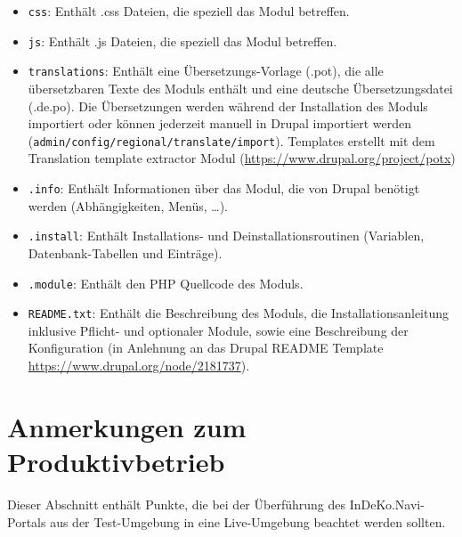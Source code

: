 \begin{itemize}
	\item \lstinline|css|: Enthält .css Dateien, die speziell das Modul betreffen.
	
	\item \lstinline|js|: Enthält .js Dateien, die speziell das Modul betreffen.
	
	\item \lstinline|translations|: Enthält eine Übersetzungs-Vorlage (.pot), die alle übersetzbaren Texte des Moduls enthält und eine deutsche Übersetzungsdatei (.de.po). Die Übersetzungen werden während der Installation des Moduls importiert oder können jederzeit manuell in Drupal importiert werden (\lstinline|admin/config/regional/translate/import|). Templates erstellt mit dem Translation template extractor Modul (\url{https://www.drupal.org/project/potx})
	
	\item \lstinline|.info|: Enthält Informationen über das Modul, die von Drupal benötigt werden (Abhängigkeiten, Menüs, \dots).
	
	\item \lstinline|.install|: Enthält Installations- und Deinstallationsroutinen (Variablen, Datenbank-Tabellen und Einträge).
	
	\item \lstinline|.module|: Enthält den PHP Quellcode des Moduls.
	
	\item \lstinline|README.txt|: Enthält die Beschreibung des Moduls, die Installationsanleitung inklusive Pflicht- und optionaler Module, sowie eine Beschreibung der Konfiguration (in Anlehnung an das Drupal README Template \url{https://www.drupal.org/node/2181737}).
\end{itemize}




\section{Anmerkungen zum Produktivbetrieb}\label{sec:live}
Dieser Abschnitt enthält Punkte, die bei der Überführung des InDeKo.Navi-Portals aus der Test-Umgebung in eine Live-Umgebung beachtet werden sollten.

